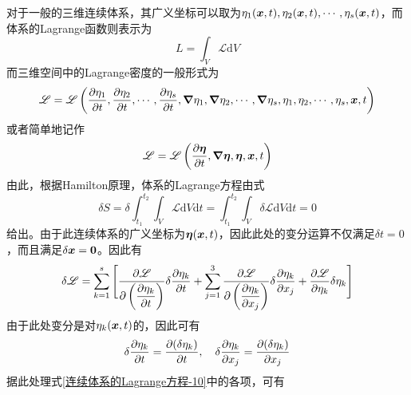 对于一般的三维连续体系，其广义坐标可以取为$\eta_1(\boldsymbol{x},t),\eta_2(\boldsymbol{x},t),\cdots,\eta_s(\boldsymbol{x},t)$，而体系的Lagrange函数则表示为
\begin{equation}
	L = \int_V \mathscr{L} \mathrm{d}V
	\label{连续体系的Lagrange方程-7}
\end{equation}
而三维空间中的Lagrange密度的一般形式为
\begin{equation*}
	\mathscr{L} = \mathscr{L} \left(\frac{\partial \eta_1}{\partial t}, \frac{\partial \eta_2}{\partial t}, \cdots, \frac{\partial \eta_s}{\partial t}, \boldsymbol{\nabla} \eta_1, \boldsymbol{\nabla} \eta_2, \cdots, \boldsymbol{\nabla} \eta_s, \eta_1, \eta_2, \cdots, \eta_s, \boldsymbol{x},t\right)
\end{equation*}
或者简单地记作
\begin{equation}
	\mathscr{L} = \mathscr{L} \left(\frac{\partial \boldsymbol{\eta}}{\partial t}, \boldsymbol{\nabla} \boldsymbol{\eta}, \boldsymbol{\eta}, \boldsymbol{x},t\right)
	\label{连续体系的Lagrange方程-8}
\end{equation}
由此，根据Hamilton原理，体系的Lagrange方程由式
\begin{equation}
	\delta S = \delta \int_{t_1}^{t_2} \int_V \mathscr{L} \mathrm{d}V \mathrm{d}t = \int_{t_1}^{t_2} \int_V \delta \mathscr{L} \mathrm{d}V \mathrm{d}t = 0
	\label{连续体系的Lagrange方程-9}
\end{equation}
给出。由于此连续体系的广义坐标为$\boldsymbol{\eta}(\boldsymbol{x},t)$，因此此处的变分运算不仅满足$\delta t = 0$，而且满足$\delta \boldsymbol{x} = \boldsymbol{0}$。因此有
\begin{align}
	\delta \mathscr{L} = \sum_{k=1}^s \Bigg[\frac{\partial \mathscr{L}}{\partial \left(\dfrac{\partial \eta_k}{\partial t}\right)} \delta \dfrac{\partial \eta_k}{\partial t} + \sum_{j=1}^3 \frac{\partial \mathscr{L}}{\partial \left(\dfrac{\partial \eta_k}{\partial x_j}\right)} \delta \dfrac{\partial \eta_k}{\partial x_j} + \frac{\partial \mathscr{L}}{\partial \eta_k} \delta \eta_k\Bigg]
	\label{连续体系的Lagrange方程-10}
\end{align}
由于此处变分是对$\eta_k(\boldsymbol{x},t)$的，因此可有
\begin{equation*}
	\delta \frac{\partial \eta_k}{\partial t} = \frac{\partial (\delta \eta_k)}{\partial t},\quad \delta \frac{\partial \eta_k}{\partial x_j} = \frac{\partial (\delta \eta_k)}{\partial x_j}
\end{equation*}
据此处理式\eqref{连续体系的Lagrange方程-10}中的各项，可有
